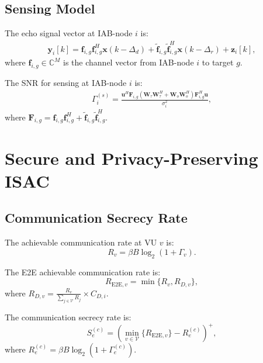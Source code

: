 \documentclass[journal]{IEEEtran}
\begin{document}
\subsection{Sensing Model}

The echo signal vector at IAB-node $i$ is:
\begin{align}\label{Eqn:SensingSigIAB-i}
\mathbf{y}_{i}[k] = \mathbf{f}_{i,g}\mathbf{f}_{i,g}^H \mathbf{x}(k-\Delta_d) + \tilde{\mathbf{f}}_{i,g} \tilde{\mathbf{f}}_{i,g}^H\mathbf{x}(k-\Delta_r) + \mathbf{z}_i[k],
\end{align}
where $\mathbf{f}_{i,g} \in \mathbb{C}^{M}$ is the channel vector from IAB-node $i$ to target $g$.

The SNR for sensing at IAB-node $i$ is:
\begin{align}\label{Eqn:SensingSNR_IAB-i}
\Gamma^{(s)}_i =  \frac{\mathbf{u}^H\mathbf{F}_{i,g}(\mathbf{W}_{\tau}\mathbf{W}^H_{\tau}+\mathbf{W}_o\mathbf{W}^H_o) \mathbf{F}^H_{i,g}\mathbf{u}}{\sigma^2_i},
\end{align}
where $\mathbf{F}_{i,g} = \mathbf{f}_{i,g}\mathbf{f}^H_{i,g}+\tilde{\mathbf{f}}_{i,g} \tilde{\mathbf{f}}_{i,g}^H$.

\section{Secure and Privacy-Preserving ISAC}\label{Sec:OptBF}

\subsection{Communication Secrecy Rate}

The achievable communication rate at VU $v$ is:
\begin{equation}
	R_v = \beta B\log_2 \left( 1 + \Gamma_v \right).
\end{equation} 

The E2E achievable communication rate is:
\begin{equation}
	R_{\text{E2E},v} = \min \{ R_v, R_{D,v}\},
\end{equation}
where $R_{D,v} = \frac{R_v}{\sum_{j\in\mathcal{V}} R_j}\times C_{D,i}$.

The communication secrecy rate is:
\begin{equation}
	S^{(c)}_e = \left(\min_{v\in\mathcal{V}}\{R_{\text{E2E},v}\} - R^{(c)}_e \right)^+,
\end{equation}
where $R^{(c)}_e = \beta B \log_2(1+\Gamma^{(c)}_e)$.
\end{document}
